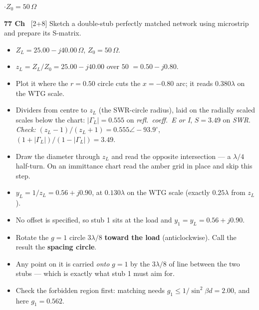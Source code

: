 {\color{sub}\footnotesize {} \gap$\cdot$\gap $Z_0 = 50\,\Omega$}

\begin{asked}{\textbf{77 Ch} \ [2+8]}
Sketch a double-stub perfectly matched network using microstrip and prepare its S-matrix.
\end{asked}
\begin{itemize}
  \item $Z_L = 25.00 - j40.00\,\Omega$, $Z_0 = 50\,\Omega$.
\end{itemize}
\begin{itemize}
  \item $z_L = Z_L/Z_0 = 25.00 - j40.00$ over $50$ $=0.50 - j0.80$.
  \item Plot it where the $r = 0.50$ circle cuts the $x = -0.80$ arc; it reads $0.380\lambda$ on the WTG scale.
  \item Dividers from centre to $z_L$ (the SWR-circle radius), laid on the radially scaled scales below the chart: $|\Gamma_L| = 0.555$ on \emph{refl.\ coeff.\ E or I}, $S = 3.49$ on \emph{SWR}. \textit{Check:} $(z_L-1)/(z_L+1) = 0.555\angle -93.9^\circ$, $(1+|\Gamma_L|)/(1-|\Gamma_L|) = 3.49$.
\end{itemize}
\begin{itemize}
  \item Draw the diameter through $z_L$ and read the opposite intersection --- a $\lambda/4$ half-turn. On an immittance chart read the amber grid in place and skip this step.
  \item $y_L = 1/z_L = 0.56 + j0.90$, at $0.130\lambda$ on the WTG scale (exactly $0.25\lambda$ from $z_L$).
\end{itemize}
\begin{itemize}
  \item No offset is specified, so stub 1 sits at the load and $y_1 = y_L = 0.56 + j0.90$.
\end{itemize}
\begin{itemize}
  \item Rotate the $g=1$ circle $3\lambda/8$ \textbf{toward the load} (anticlockwise). Call the result the \textbf{spacing circle}.
  \item Any point on it is carried \emph{onto} $g=1$ by the $3\lambda/8$ of line between the two stubs --- which is exactly what stub 1 must aim for.
  \item Check the forbidden region first: matching needs $g_1 \le 1/\sin^2\beta d = 2.00$, and here $g_1 = 0.562$. \checkmark
\end{itemize}
